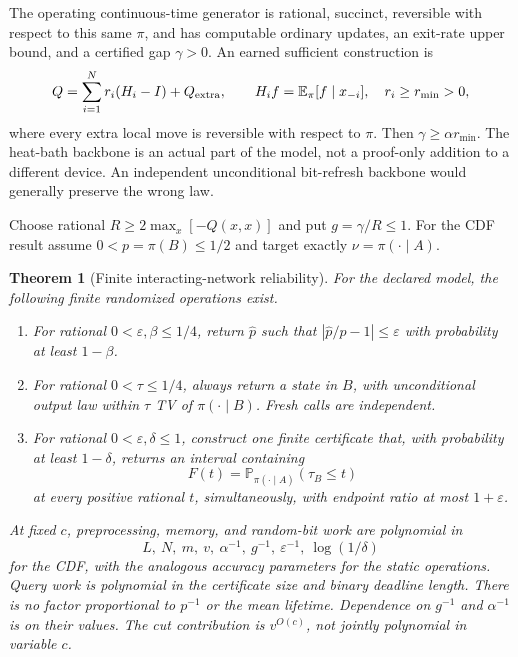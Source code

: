 \documentclass[11pt]{article}
\newtheorem{theorem}{Theorem}[section]
\newcommand{\E}{\mathbb E}
\newcommand{\Prb}{\mathbb P}
\newcommand{\eps}{\varepsilon}
\begin{document}
The operating continuous-time generator is rational, succinct, reversible with respect to this same $\pi$, and has computable ordinary updates, an exit-rate upper bound, and a certified gap $\gamma>0$. An earned sufficient construction is
\begin{equation}
 Q=\sum_{i=1}^N r_i(H_i-I)+Q_{\rm extra},\qquad
 H_if=\E_\pi[f\mid x_{-i}],\quad r_i\ge r_{\min}>0,
 \label{eq:dynamics}
\end{equation}
where every extra local move is reversible with respect to $\pi$. Then $\gamma\ge\alpha r_{\min}$. The heat-bath backbone is an actual part of the model, not a proof-only addition to a different device. An independent unconditional bit-refresh backbone would generally preserve the wrong law.

Choose rational $R\ge2\max_x[-Q(x,x)]$ and put $g=\gamma/R\le1$. For the CDF result assume $0<p=\pi(B)\le1/2$ and target exactly $\nu=\pi(\cdot\mid A)$.

\begin{theorem}[Finite interacting-network reliability]
\label{thm:main}
For the declared model, the following finite randomized operations exist.
\begin{enumerate}
\item For rational $0<\eps,\beta\le1/4$, return $\widehat p$ such that $|\widehat p/p-1|\le\eps$ with probability at least $1-\beta$.
\item For rational $0<\tau\le1/4$, always return a state in $B$, with unconditional output law within $\tau$ TV of $\pi(\cdot\mid B)$. Fresh calls are independent.
\item For rational $0<\eps,\delta\le1$, construct one finite certificate that, with probability at least $1-\delta$, returns an interval containing
\[
 F(t)=\Prb_{\pi(\cdot\mid A)}(\tau_B\le t)
\]
at every positive rational $t$, simultaneously, with endpoint ratio at most $1+\eps$.
\end{enumerate}
At fixed $c$, preprocessing, memory, and random-bit work are polynomial in
\[
 L,\ N,\ m,\ v,\ \alpha^{-1},\ g^{-1},\ \eps^{-1},\ \log(1/\delta)
\]
for the CDF, with the analogous accuracy parameters for the static operations. Query work is polynomial in the certificate size and binary deadline length. There is no factor proportional to $p^{-1}$ or the mean lifetime. Dependence on $g^{-1}$ and $\alpha^{-1}$ is on their values. The cut contribution is $v^{O(c)}$, not jointly polynomial in variable $c$.
\end{theorem}
\end{document}

